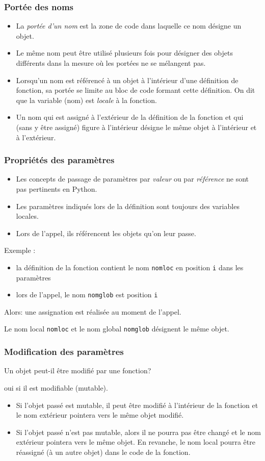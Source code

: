 \begin{frame}
  \frametitle{Portée des noms}
\begin{itemize}
  \item La \emph{portée d'un nom} est la zone de code dans laquelle ce nom désigne un objet.
  \item Le même nom peut être utilisé plusieurs fois pour désigner des objets différents dans la mesure où les portées ne se mélangent pas.
  \item Lorsqu'un nom est référencé à un objet à l'intérieur d'une définition de fonction, sa portée se limite au bloc de code formant cette définition. On dit que la variable (nom) est \emph{locale} à la fonction.
  \item Un nom qui est assigné à l'extérieur de la définition de la fonction et qui (sans y être assigné) figure à l'intérieur désigne le même objet à l'intérieur et à l'extérieur.
\end{itemize}
\end{frame}

\begin{frame}
  \frametitle{Propriétés des paramètres}
\begin{itemize}
  \item Les concepts de passage de paramètres par \emph{valeur} ou par \emph{référence} ne sont pas pertinents en Python.
  \item Les paramètres indiqués lors de la définition sont toujours des variables locales.
  \item Lors de l'appel, ils référencent les objets qu'on leur passe.
\end{itemize}
Exemple :
\begin{itemize}
  \item la définition de la fonction contient le nom \texttt{nomloc} en position \texttt{i} dans les paramètres
  \item lors de l'appel, le nom \texttt{nomglob} est position \texttt{i}
\end{itemize}
Alors: une assignation est réalisée au moment de l'appel.

Le nom local \texttt{nomloc} et le nom global \texttt{nomglob} désignent le même objet.\newline
\end{frame}

\begin{frame}
  \frametitle{Modification des paramètres}
Un objet peut-il être modifié par une fonction?

oui si il est modifiable (mutable).\newline
\begin{itemize}
  \item Si l'objet passé est mutable, il peut être modifié à l'intérieur de la fonction et le nom extérieur pointera vers le même objet modifié.
  \item Si l'objet passé n'est pas mutable, alors il ne pourra pas être changé et le nom extérieur pointera vers le même objet. En revanche, le nom local pourra être réassigné (à un autre objet) dans le code de la fonction. 

\end{itemize}
\end{frame}


